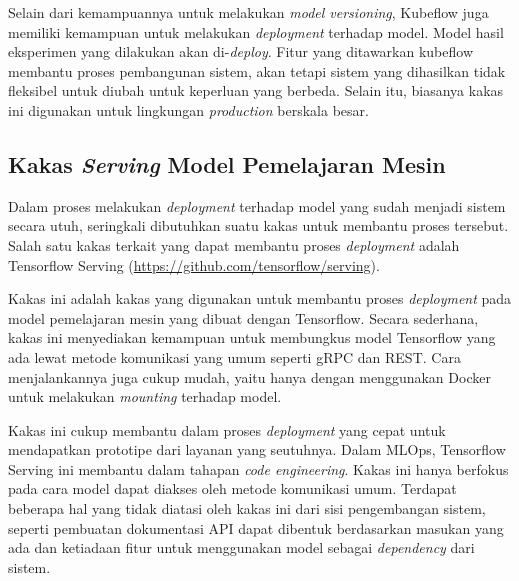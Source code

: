 Selain dari kemampuannya untuk melakukan \textit{model versioning}, Kubeflow juga memiliki kemampuan untuk melakukan \textit{deployment} terhadap model.
Model hasil eksperimen yang dilakukan akan di-\textit{deploy}.
Fitur yang ditawarkan kubeflow membantu proses pembangunan sistem, akan tetapi sistem yang dihasilkan tidak fleksibel untuk diubah untuk keperluan yang berbeda.
Selain itu, biasanya kakas ini digunakan untuk lingkungan \textit{production} berskala besar.

\subsection{Kakas \textit{Serving} Model Pemelajaran Mesin}

Dalam proses melakukan \textit{deployment} terhadap model yang sudah menjadi sistem secara utuh, seringkali dibutuhkan suatu kakas untuk membantu proses tersebut.
Salah satu kakas terkait yang dapat membantu proses \textit{deployment} adalah Tensorflow Serving (\href{https://github.com/tensorflow/serving}{https://github.com/tensorflow/serving}).

Kakas ini adalah kakas yang digunakan untuk membantu proses \textit{deployment} pada model pemelajaran mesin yang dibuat dengan Tensorflow.
Secara sederhana, kakas ini menyediakan kemampuan untuk membungkus model Tensorflow yang ada lewat metode komunikasi yang umum seperti gRPC dan REST.\@
Cara menjalankannya juga cukup mudah, yaitu hanya dengan menggunakan Docker untuk melakukan \textit{mounting} terhadap model.

Kakas ini cukup membantu dalam proses \textit{deployment} yang cepat untuk mendapatkan prototipe dari layanan yang seutuhnya.
Dalam MLOps, Tensorflow Serving ini membantu dalam tahapan \textit{code engineering}.
Kakas ini hanya berfokus pada cara model dapat diakses oleh metode komunikasi umum.
Terdapat beberapa hal yang tidak diatasi oleh kakas ini dari sisi pengembangan sistem, seperti pembuatan dokumentasi API dapat dibentuk berdasarkan masukan yang ada dan ketiadaan fitur untuk menggunakan model sebagai \textit{dependency} dari sistem.

